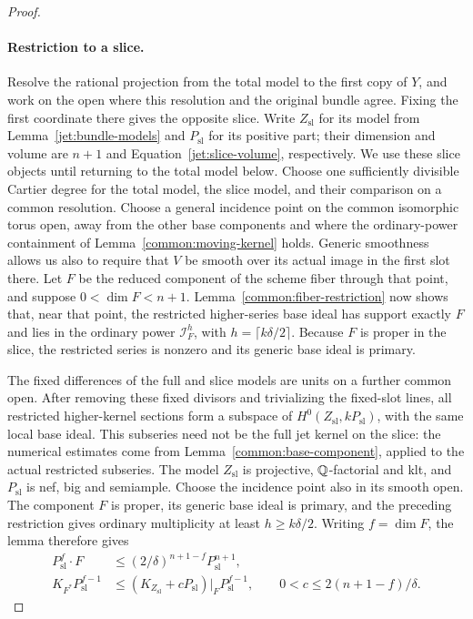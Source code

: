 \begin{proof}
\paragraph{Restriction to a slice.}
Resolve the rational projection from the total model to the first copy
of \(Y\), and work on the open where this resolution and the original
bundle agree. Fixing the first coordinate there gives the opposite
slice. Write \(Z_{\mathrm{sl}}\) for its model from
Lemma~\ref{jet:bundle-models} and \(P_{\mathrm{sl}}\) for its positive
part; their dimension and volume are \(n+1\) and
Equation~\eqref{jet:slice-volume}, respectively. We use these slice
objects until returning to the total model below. Choose one sufficiently
divisible Cartier degree for the total model, the slice model, and
their comparison on a common resolution.
Choose a general incidence point on the common isomorphic torus open,
away from the other base components and where the ordinary-power
containment of Lemma~\ref{common:moving-kernel} holds. Generic smoothness
allows us also to require that \(V\) be smooth over its actual image
in the first slot there. Let \(F\) be the reduced component of the
scheme fiber through that point, and suppose \(0<\dim F<n+1\).
Lemma~\ref{common:fiber-restriction} now shows that, near that point, the
restricted higher-series base ideal has support exactly \(F\) and lies in the
ordinary power \(\mathcal I_F^h\), with \(h=\lceil k\delta/2\rceil\).
Because \(F\) is proper in the slice, the restricted series is nonzero
and its generic base ideal is primary.

The fixed differences of the full and slice models are units on a
further common open. After removing these fixed divisors and trivializing
the fixed-slot lines, all restricted higher-kernel sections form a
subspace of \(H^0(Z_{\mathrm{sl}},kP_{\mathrm{sl}})\), with the same
local base ideal. This subseries need not be the full jet kernel on
the slice: the numerical estimates come from
Lemma~\ref{common:base-component}, applied to the actual restricted
subseries.
The model \(Z_{\mathrm{sl}}\) is projective,
\(\mathbb{Q}\)-factorial and klt, and \(P_{\mathrm{sl}}\) is nef, big and
semiample. Choose the incidence point also in its smooth open.
The component \(F\) is proper, its generic base ideal is primary, and
the preceding restriction gives ordinary multiplicity at least
\(h\ge k\delta/2\). Writing \(f=\dim F\), the lemma therefore gives
\[
 \begin{aligned}
 P_{\mathrm{sl}}^f\cdot F
 &\le(2/\delta)^{n+1-f}P_{\mathrm{sl}}^{n+1},\\
 K_{F^*}P_{\mathrm{sl}}^{f-1}
 &\le(K_{Z_{\mathrm{sl}}}+cP_{\mathrm{sl}})|_F
       P_{\mathrm{sl}}^{f-1},
 \qquad 0<c\le2(n+1-f)/\delta.
 \end{aligned}
\]


\end{proof}
